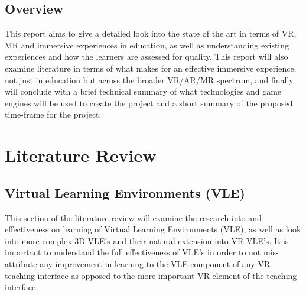 \documentclass[11pt]{report}
\begin{document}
\section{Overview}
This report aims to give a detailed look into the state of the art in terms of VR, MR and immersive experiences in education, as well as understanding existing experiences and how the learners are assessed for quality. This report will also examine literature in terms of what makes for an effective immersive experience, not just in education but across the broader VR/AR/MR spectrum, and finally will conclude with a brief technical summary of what technologies and game engines will be used to create the project and a short summary of the proposed time-frame for the project.
\chapter{Literature Review}
\section{Virtual Learning Environments (VLE)}
This section of the literature review will examine the research into and effectiveness on learning of Virtual Learning Environments (VLE), as well as look into more complex 3D VLE's and their natural extension into VR VLE's. It is important to understand the full effectiveness of VLE's in order to not mis-attribute any improvement in learning to the VLE component of any VR teaching interface as opposed to the more important VR element of the teaching interface. 
\end{document}
